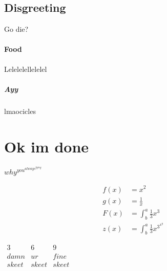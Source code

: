 \documentclass{article}
\begin{document}
	\subsection{Disgreeting}
	Go die?
	
	\paragraph{Food}
	Lelelelellelelel
	
	\subparagraph{Ayy}
	lmaocicles
	
	\section{Ok im done}
	$ why^{you^{always^{lying}}} $

\begin{align*}
  f(x) &= x^2\\
  g(x) &= \frac{1}{x}\\
  F(x) &= \int^a_b \frac{1}{3}x^3\\
  z(x) &= \int^a_b \frac{1}{3}x^{3^{x^y}}  
\end{align*}



$
\begin{matrix}
3 & 6 & 9 \\
damn & ur & fine \\ 
skeet & skeet & skeet
\end{matrix}
$





	
\end{document}
